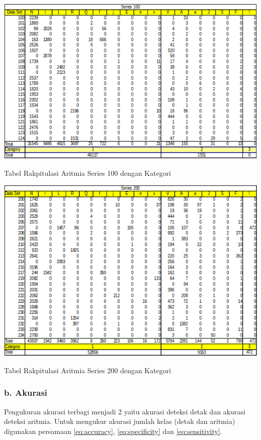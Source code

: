 \begin{table}[H]
	\centering
	\includegraphics[scale=0.7]{images/result1.png}
	\caption{Tabel Rakpitulasi Aritmia Series 100 dengan Kategori}
	\label{tabel:result1}
\end{table}
\begin{table}[H]
	\centering
	\includegraphics[scale=0.7]{images/result2.png}
	\caption{Tabel Rakpitulasi Aritmia Series 200 dengan Kategori}
	\label{tabel:result2}
\end{table}

\subsubsection{b. Akurasi}
Pengukuran akurasi terbagi menjadi 2 yaitu akurasi deteksi detak dan akurasi deteksi aritmia. Untuk mengukur akurasi jumlah kelas (detak dan aritmia) digunakan persamaan \ref{eq:accuracy}, \ref{eq:specificity} dan \ref{eq:sensitivity}.

